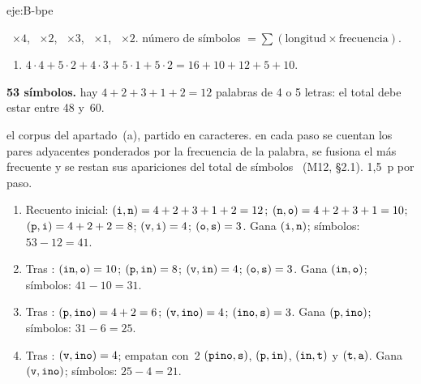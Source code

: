 \begin{solucion}{eje:B-bpe}

\datos {}~$\times 4$, ~$\times 2$, ~$\times 3$, ~$\times 1$, ~$\times 2$.
\planteamiento número de símbolos $=\sum(\text{longitud}\times\text{frecuencia})$.
\pasos
\begin{enumerate}[label=\arabic*.]
  \item $4\cdot 4+5\cdot 2+4\cdot 3+5\cdot 1+5\cdot 2=16+10+12+5+10$.
\end{enumerate}
\resultado \textbf{53 símbolos.}
\comprobacion hay $4+2+3+1+2=12$ palabras de 4 o 5 letras: el total debe estar entre 48 y~60.

\datos el corpus del apartado~(a), partido en caracteres.
\planteamiento en cada paso se cuentan los pares adyacentes ponderados por la frecuencia de la palabra, se fusiona el más frecuente y se restan sus apariciones del total de símbolos~\cite{sennrich} (M12, §2.1). 1,5~p por paso.
\pasos
\begin{enumerate}[label=\arabic*.]
  \item Recuento inicial: $(\textmd{\texttt{i}},\textmd{\texttt{n}})=4+2+3+1+2=12$; $(\textmd{\texttt{n}},\textmd{\texttt{o}})=4+2+3+1=10$; $(\textmd{\texttt{p}},\textmd{\texttt{i}})=4+2+2=8$; $(\textmd{\texttt{v}},\textmd{\texttt{i}})=4$; $(\textmd{\texttt{o}},\textmd{\texttt{s}})=3$. Gana $(\textmd{\texttt{i}},\textmd{\texttt{n}})$; símbolos: $53-12=41$.
  \item Tras : $(\textmd{\texttt{in}},\textmd{\texttt{o}})=10$; $(\textmd{\texttt{p}},\textmd{\texttt{in}})=8$; $(\textmd{\texttt{v}},\textmd{\texttt{in}})=4$; $(\textmd{\texttt{o}},\textmd{\texttt{s}})=3$. Gana $(\textmd{\texttt{in}},\textmd{\texttt{o}})$; símbolos: $41-10=31$.
  \item Tras : $(\textmd{\texttt{p}},\textmd{\texttt{ino}})=4+2=6$; $(\textmd{\texttt{v}},\textmd{\texttt{ino}})=4$; $(\textmd{\texttt{ino}},\textmd{\texttt{s}})=3$. Gana $(\textmd{\texttt{p}},\textmd{\texttt{ino}})$; símbolos: $31-6=25$.
  \item Tras : $(\textmd{\texttt{v}},\textmd{\texttt{ino}})=4$; empatan con~2 $(\textmd{\texttt{pino}},\textmd{\texttt{s}})$, $(\textmd{\texttt{p}},\textmd{\texttt{in}})$, $(\textmd{\texttt{in}},\textmd{\texttt{t}})$ y $(\textmd{\texttt{t}},\textmd{\texttt{a}})$. Gana $(\textmd{\texttt{v}},\textmd{\texttt{ino}})$; símbolos: $25-4=21$.
\end{enumerate}


\end{solucion}
